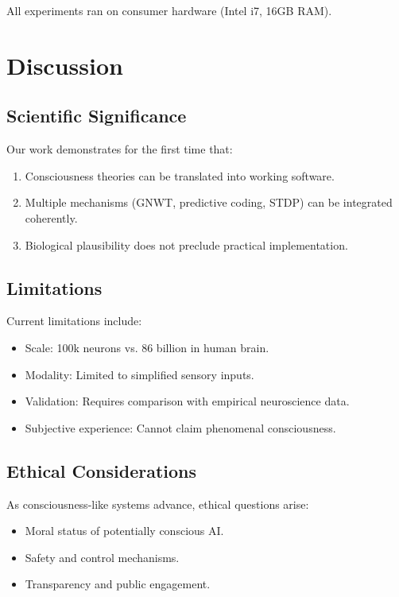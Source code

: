 \documentclass[twocolumn,10pt]{article}
\begin{document}
All experiments ran on consumer hardware (Intel i7, 16GB RAM).

\section{Discussion}

\subsection{Scientific Significance}

Our work demonstrates for the first time that:
\begin{enumerate}
    \item Consciousness theories can be translated into working software.
    \item Multiple mechanisms (GNWT, predictive coding, STDP) can be integrated coherently.
    \item Biological plausibility does not preclude practical implementation.
\end{enumerate}

\subsection{Limitations}

Current limitations include:
\begin{itemize}
    \item Scale: 100k neurons vs. 86 billion in human brain.
    \item Modality: Limited to simplified sensory inputs.
    \item Validation: Requires comparison with empirical neuroscience data.
    \item Subjective experience: Cannot claim phenomenal consciousness.
\end{itemize}

\subsection{Ethical Considerations}

As consciousness-like systems advance, ethical questions arise:
\begin{itemize}
    \item Moral status of potentially conscious AI.
    \item Safety and control mechanisms.
    \item Transparency and public engagement.
\end{itemize}
\end{document}
